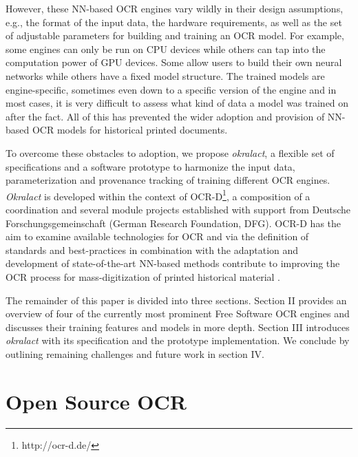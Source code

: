 \documentclass[sigconf]{acmart}
\begin{document}

However, these NN-based OCR engines vary wildly in their design
assumptions, e.g., the format of the input data, the hardware
requirements, as well as the set of adjustable parameters for
building and training an OCR model. For example, some engines can
only be run on CPU devices while others can tap into the
computation power of GPU devices. Some allow users to build their
own neural networks while others have a fixed model structure. The
trained models are engine-specific, sometimes even down to a specific
version of the engine and in most cases, it is very difficult to
assess what kind of data a model was trained on after the fact. All
of this has prevented the wider adoption and provision of NN-based 
OCR models for historical printed documents.

To overcome these obstacles to adoption, we propose
\textit{okralact}, a flexible set of specifications and a software
prototype to harmonize the input data, parameterization and
provenance tracking of training different OCR engines.
\textit{Okralact} is developed within the context of
OCR-D\footnote{http://ocr-d.de/}, a composition of a
coordination and several module projects established with support
from Deutsche Forschungsgemeinschaft (German Research Foundation,
DFG). OCR-D has the aim to examine available technologies for OCR and via the 
definition of standards and best-practices in combination with the adaptation and development of state-of-the-art NN-based methods contribute to improving the OCR process for mass-digitization of 
printed historical material \cite{neudecker2019datech}.  


The remainder of this paper is divided into three sections. Section
II provides an overview of four of the currently most prominent Free
Software OCR engines and discusses their training features and models 
in more depth. Section III introduces \textit{okralact} with its
specification and the prototype implementation. We conclude by 
outlining remaining challenges and future work in section IV. 

\section{Open Source OCR}
\end{document}
